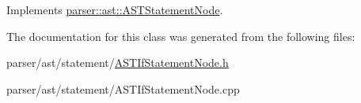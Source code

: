 Implements \hyperlink{classparser_1_1ast_1_1ASTStatementNode_ac381d35d12f774a1bab0e209c5bfec1f}{parser\+::ast\+::\+A\+S\+T\+Statement\+Node}.



The documentation for this class was generated from the following files\+:\begin{DoxyCompactItemize}
\item 
parser/ast/statement/\hyperlink{ASTIfStatementNode_8h}{A\+S\+T\+If\+Statement\+Node.\+h}\item 
parser/ast/statement/A\+S\+T\+If\+Statement\+Node.\+cpp\end{DoxyCompactItemize}
